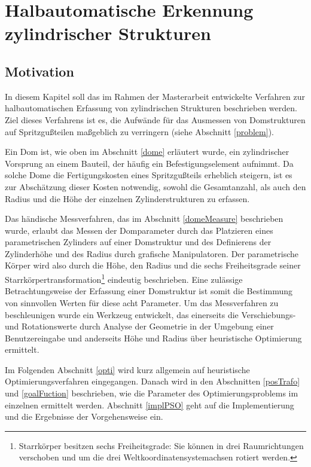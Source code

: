 \chapter{Halbautomatische Erkennung zylindrischer Strukturen}
\label{cha:psoDomes}	
	

\section{Motivation}

In diesem Kapitel soll das im Rahmen der Masterarbeit entwickelte Verfahren zur halbautomatischen Erfassung 
von zylindrischen Strukturen beschrieben werden. Ziel dieses Verfahrens ist es, die Aufw\"ande f\"ur das Ausmessen von Domstrukturen auf Spritzgu{\ss}teilen ma{\ss}geblich zu verringern (siehe Abschnitt \ref{problem}). 

Ein Dom ist, wie oben im Abschnitt \ref{dome} erl\"autert wurde, ein zylindrischer Vorsprung an einem Bauteil, der h\"aufig ein Befestigungselement aufnimmt. Da solche Dome die Fertigungskosten eines Spritzgu{\ss}teils erheblich steigern, ist es zur Absch\"atzung dieser Kosten notwendig, sowohl die Gesamtanzahl, als auch den Radius und die H\"ohe der einzelnen Zylinderstrukturen zu erfassen.

Das h\"andische Messverfahren, das im Abschnitt \ref{domeMeasure} beschrieben wurde, erlaubt das Messen der Domparameter durch das Platzieren eines parametrischen Zylinders auf einer Domstruktur und des Definierens der Zylinderh\"ohe und des Radius durch grafische Manipulatoren. 
Der parametrische K\"orper wird also durch die H\"ohe, den Radius und die sechs Freiheitsgrade seiner Starrk\"orpertransformation\footnote{Starrkörper besitzen sechs Freiheitsgrade: Sie können in drei Raumrichtungen
verschoben und um die drei Weltkoordinatensystemachsen rotiert werden.} eindeutig beschrieben. Eine zul\"assige Betrachtungsweise der Erfassung einer Domstruktur ist somit die Bestimmung von sinnvollen Werten für diese acht Parameter. Um das Messverfahren zu beschleunigen wurde ein Werkzeug entwickelt, das einerseits die Verschiebungs- und
Rotationswerte durch Analyse der Geometrie in der Umgebung einer Benutzereingabe und anderseits H\"ohe und Radius über heuristische Optimierung ermittelt.

Im Folgenden Abschnitt \ref{opti} wird kurz allgemein auf heuristische Optimierungsverfahren eingegangen. Danach wird in den Abschnitten  \ref{posTrafo} und \ref{goalFuction} beschrieben, wie die Parameter des Optimierungsproblems im einzelnen ermittelt werden. Abschnitt \ref{implPSO} geht auf die Implementierung und die Ergebnisse der Vorgehensweise ein.


